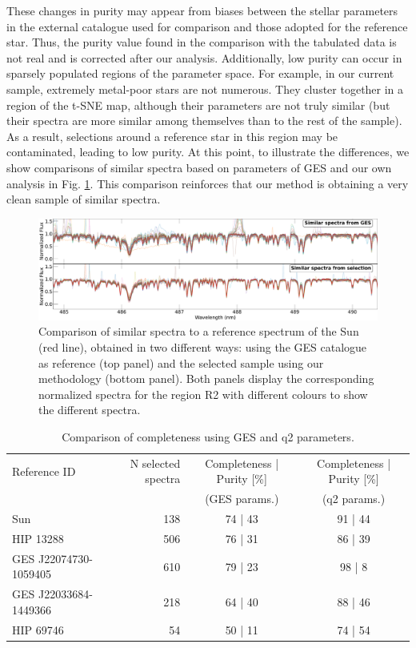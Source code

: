 \documentclass{aa}
\begin{document}
These changes in purity may appear from biases between the stellar parameters in the external catalogue used for comparison and those adopted for the reference star. Thus, the purity value found in the comparison with the tabulated data is not real and is corrected after our analysis. Additionally, low purity can occur in sparsely populated regions of the parameter space. For example, in our current sample, extremely metal-poor stars are not numerous. They cluster together in a region of the t-SNE map, although their parameters are not truly similar (but their spectra are more similar among themselves than to the rest of the sample). As a result, selections around a reference star in this region may be contaminated, leading to low purity. At this point, to illustrate the differences, we show comparisons of similar spectra based on parameters of GES and our own analysis in Fig. \ref{fig:SUN_similar_spectra}. This comparison reinforces that our method is obtaining a very clean sample of similar spectra.

\begin{figure}[t]
    \centering
    \includegraphics[width=\linewidth]{Plots/SUNuul_GES_similar_spec.pdf}
    \caption{Comparison of similar spectra to a reference spectrum of the Sun (red line), obtained in two different ways: using the GES catalogue as reference (top panel) and the selected sample using our methodology (bottom panel). Both panels display the corresponding normalized spectra for the region R2 with different colours to show the different spectra.}
    \label{fig:SUN_similar_spectra}
\end{figure}


\begin{table}
\caption{Comparison of completeness using GES and q2 parameters.}
\label{tab:q2}
\centering
\begin{tabular}{l r c c}
\hline\hline
Reference ID & N selected spectra & Completeness | Purity [\%] & Completeness | Purity [\%] \\
             &                    & (GES params.)              & (q2 params.)              \\
\hline
Sun                      & 138          & 74 | 43           & 91 | 44         \\
HIP 13288                & 506          & 76 | 31           & 86 | 39         \\
GES J22074730-1059405    & 610          & 79 | 23           & 98 | 8          \\
GES J22033684-1449366    & 218          & 64 | 40           & 88 | 46         \\
HIP 69746                & 54           & 50 | 11           & 74 | 54         \\
\hline
\end{tabular}
\end{table}
\end{document}
